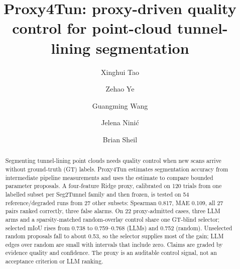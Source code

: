 \documentclass[a4paper,fleqn]{cas-dc}
\begin{document}
\let\WriteBookmarks\relax
\def\floatpagepagefraction{1}
\def\textpagefraction{.001}



\title[mode=title]{\texorpdfstring{Proxy4Tun: proxy-driven quality control for point-cloud tunnel-lining segmentation}{Proxy4Tun: proxy-driven quality control for point-cloud tunnel-lining segmentation}}

\author[1]{Xinghui Tao}

\author[2]{Zehao Ye}

\author[1]{Guangming Wang}
\cormark[1]

\author[2]{Jelena Nini\'{c}}

\author[1]{Brian Sheil}





\begin{abstract}
Segmenting tunnel-lining point clouds needs quality control when new scans arrive without ground-truth (GT) labels. Proxy4Tun estimates segmentation accuracy from intermediate pipeline measurements and uses the estimate to compare bounded parameter proposals. A four-feature Ridge proxy, calibrated on 120 trials from one labelled subset per Seg2Tunnel family and then frozen, is tested on 54 reference/degraded runs from 27 other subsets: Spearman 0.817, MAE 0.109, all 27 pairs ranked correctly, three false alarms. On 22 proxy-admitted cases, three LLM arms and a sparsity-matched random-overlay control share one GT-blind selector; selected mIoU rises from 0.738 to 0.759--0.768 (LLMs) and 0.752 (random). Unselected random proposals fall to about 0.53, so the selector supplies most of the gain; LLM edges over random are small with intervals that include zero. Claims are graded by evidence quality and confidence. The proxy is an auditable control signal, not an acceptance criterion or LLM ranking.
\end{abstract}
\end{document}
